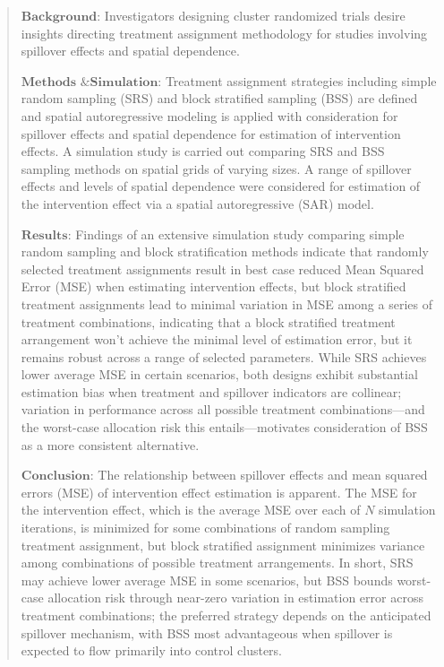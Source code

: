 \documentclass{article}[11pt]
\begin{document}
\begin{abstract}
   $\textbf{Background}$: Investigators designing cluster randomized trials desire insights directing treatment assignment methodology for studies involving spillover effects and spatial dependence.

   $\textbf{Methods \& Simulation}$: Treatment assignment strategies including simple random sampling (SRS) and block stratified sampling (BSS) are defined and spatial autoregressive modeling is applied with consideration for spillover effects and spatial dependence for estimation of intervention effects. A simulation study is carried out comparing SRS and BSS sampling methods on spatial grids of varying sizes. A range of spillover effects and levels of spatial dependence were considered for estimation of the intervention effect via a spatial autoregressive (SAR) model.


   $\textbf{Results}$: Findings of an extensive simulation study comparing simple random sampling and block stratification methods indicate that randomly selected treatment assignments result in best case reduced Mean Squared Error (MSE) when estimating intervention effects, but block stratified treatment assignments lead to minimal variation in MSE among a series of treatment combinations, indicating that a block stratified treatment arrangement won’t achieve the minimal level of estimation error, but it remains robust across a range of selected parameters. While SRS achieves lower average MSE in certain scenarios, both designs exhibit substantial estimation bias when treatment and spillover indicators are collinear; variation in performance across all possible treatment combinations---and the worst-case allocation risk this entails---motivates consideration of BSS as a more consistent alternative.


   $\textbf{Conclusion}$: The relationship between spillover effects and mean squared errors (MSE) of intervention effect estimation is apparent. The MSE for the intervention effect, which is the average MSE over each of $N$ simulation iterations, is minimized for some combinations of random sampling treatment assignment, but block stratified assignment minimizes variance among combinations of possible treatment arrangements. In short, SRS may achieve lower average MSE in some scenarios, but BSS bounds worst-case allocation risk through near-zero variation in estimation error across treatment combinations; the preferred strategy depends on the anticipated spillover mechanism, with BSS most advantageous when spillover is expected to flow primarily into control clusters.
\end{abstract}
\end{document}

